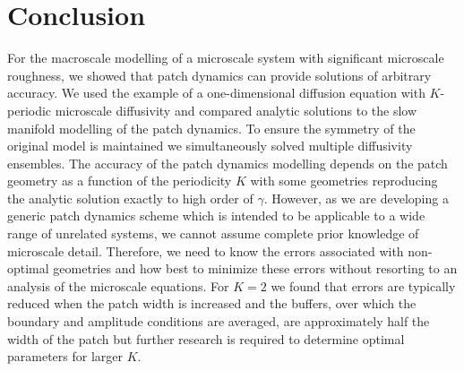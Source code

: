 \documentclass[12pt,a4paper]{article}
\begin{document}
\section{Conclusion}
\label{sec:concl}
For the macroscale modelling of a microscale system with significant microscale roughness, we showed that patch dynamics can provide solutions of arbitrary accuracy. We used the example of a one-dimensional diffusion equation with $K$-periodic microscale diffusivity and compared analytic solutions to the slow manifold modelling of the patch dynamics. To ensure the symmetry of the original model is maintained we simultaneously solved multiple diffusivity ensembles. The accuracy of the patch dynamics modelling depends on the patch geometry as a function of the periodicity $K$ with some geometries reproducing the analytic solution exactly to high order of $\gamma$. However, as we are developing a generic patch dynamics scheme which is intended to be applicable to a wide range of unrelated systems, we cannot assume complete prior knowledge of microscale detail. Therefore, we need to know the errors associated with non-optimal geometries and how best to minimize these errors without resorting to an analysis of the microscale equations. For $K=2$ we found that errors are typically reduced when the patch width is increased and the buffers, over which the boundary and amplitude conditions are averaged, are approximately half the width of the  patch but further research is required to determine optimal parameters for larger $K$. 

 
\end{document}
